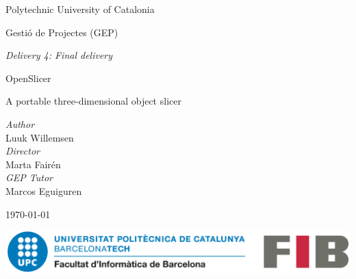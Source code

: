 
\center 

\Large
Polytechnic University of Catalonia

\vspace{.5cm}
\large
Gestió de Projectes (GEP)

\textit{Delivery 4: Final delivery}

\roboto
\vspace*{1cm}
\HUGE
\textcolor{title-red}{OpenSlicer}

\vspace{0.5cm}

\LARGE
A portable three-dimensional object slicer

\vspace{1cm}


\normalsize \textit{Author} \\ \large{Luuk Willemsen} \\ \vspace{0.5cm}
\normalsize \textit{Director} \\ \large{Marta Fairén} \\ \vspace{0.5cm}
\normalsize \textit{GEP Tutor} \\ \large{Marcos Eguiguren}


\vspace{1cm}

\normalsize
\today

\vspace{1cm}


\includegraphics[width=1\textwidth]{images/fib-upc.png}